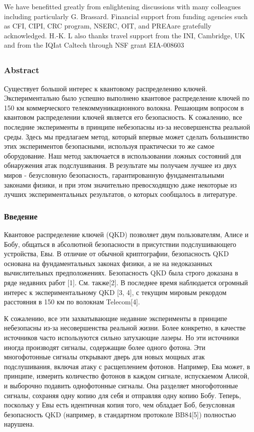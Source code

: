 We have benefitted greatly from enlightening discussions with many colleagues including particularly G. Brassard. Financial support from funding agencies such as CFI, CIPI, CRC program, NSERC, OIT, and PREAare gratefully acknowledged. H.-K. L also thanks travel support from the INI, Cambridge, UK and from the IQIat Caltech through NSF grant EIA-008603

\subsection{\trnas}
\subsubsection*{Abstract}

Существует большой интерес к квантовому распределению ключей. Экспериментально было успешно выполнено квантовое распределение ключей по 150 км коммерческого телекоммуникационного волокна. Решающим вопросом в квантовом распределении ключей является его безопасность. К сожалению, все последние эксперименты в принципе небезопасны из-за несовершенства реальной среды. Здесь мы предлагаем метод, который впервые может сделать большинство этих экспериментов безопасными, используя практически то же самое оборудование. Наш метод заключается в использовании ложных состояний для обнаружения атак подслушивания. В результате мы получаем лучшее из двух миров - безусловную безопасность, гарантированную фундаментальными законами физики, и при этом значительно превосходящую даже некоторые из лучших экспериментальных результатов, о которых сообщалось в литературе.

\subsubsection{Введение}

Квантовое распределение ключей (QKD) позволяет двум пользователям, Алисе и Бобу, общаться в абсолютной безопасности в присутствии подслушивающего устройства, Евы. В отличие от обычной криптографии, безопасность QKD основана на фундаментальных законах физики, а не на недоказанных вычислительных предположениях. Безопасность QKD была строго доказана в ряде недавних работ [1]. См. также[2]. В последнее время наблюдается огромный интерес к экспериментальному QKD [3, 4], с текущим мировым рекордом расстояния в 150 км по волокнам Telecom[4].

К сожалению, все эти захватывающие недавние эксперименты в принципе небезопасны из-за несовершенства реальной жизни.
Более конкретно, в качестве источников часто используются сильно затухающие лазеры. Но эти источники иногда производят сигналы, содержащие более одного фотона. Эти многофотонные сигналы открывают дверь для новых мощных атак подслушивания, включая атаку с расщеплением фотонов. Например, Ева может, в принципе, измерить количество фотонов в каждом сигнале, испускаемом Алисой, и выборочно подавить однофотонные сигналы. Она разделяет многофотонные сигналы, сохраняя одну копию для себя и отправляя одну копию Бобу. Теперь, поскольку у Евы есть идентичная копия того, чем обладает Боб, безусловная безопасность QKD (например, в стандартном протоколе BB84[5]) полностью нарушена.

